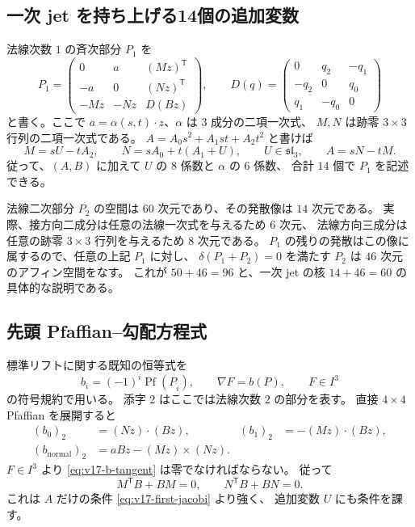 \documentclass[11pt,a4paper]{ltjsarticle}
\theoremstyle{remark}\newtheorem{remark}[theorem]{注意}
\begin{document}
\subsection{一次 jet を持ち上げる14個の追加変数}

法線次数 $1$ の斉次部分 $P_1$ を
\[
 P_1=\begin{pmatrix}
 0&a&(Mz)^{\mathsf T}\\
 -a&0&(Nz)^{\mathsf T}\\
 -Mz&-Nz&D(Bz)
 \end{pmatrix},
\qquad
 D(q)=\begin{pmatrix}0&q_2&-q_1\\-q_2&0&q_0\\q_1&-q_0&0\end{pmatrix}
\]
と書く。ここで $a=\alpha(s,t)\cdot z$、$\alpha$ は $3$ 成分の二項一次式、
$M,N$ は跡零 $3\times3$ 行列の二項一次式である。
$A=A_0s^2+A_1st+A_2t^2$ と書けば
\begin{equation}
 M=sU-tA_2,\qquad N=sA_0+t(A_1+U),\qquad U\in\mathfrak{sl}_3,
 \qquad A=sN-tM.
 \label{eq:v17-lift-mn}
\end{equation}
従って、$(A,B)$ に加えて $U$ の $8$ 係数と $\alpha$ の $6$ 係数、
合計 $14$ 個で $P_1$ を記述できる。

法線二次部分 $P_2$ の空間は $60$ 次元であり、その発散像は $14$ 次元である。
実際、接方向二成分は任意の法線一次式を与えるため $6$ 次元、
法線方向三成分は任意の跡零 $3\times3$ 行列を与えるため $8$ 次元である。
$P_1$ の残りの発散はこの像に属するので、任意の上記 $P_1$ に対し、
$\delta(P_1+P_2)=0$ を満たす $P_2$ は $46$ 次元のアフィン空間をなす。
これが $50+46=96$ と、一次 jet の核 $14+46=60$ の具体的な説明である。

\subsection{先頭 Pfaffian--勾配方程式}

標準リフトに関する既知の恒等式を
\[
 b_i=(-1)^i\operatorname{Pf}(P_{\widehat i}),\qquad
 \nabla F=b(P),\qquad F\in I^3
\]
の符号規約で用いる。
添字 $2$ はここでは法線次数 $2$ の部分を表す。
直接 $4\times4$ Pfaffian を展開すると
\begin{align}
 (b_0)_2&=(Nz)\cdot(Bz),&
 (b_1)_2&=-(Mz)\cdot(Bz),\label{eq:v17-b-tangent}\\
 (b_{\mathrm{normal}})_2&=aBz-(Mz)\times(Nz).
 \label{eq:v17-b-normal}
\end{align}
$F\in I^3$ より \eqref{eq:v17-b-tangent} は零でなければならない。
従って
\begin{equation}
 M^{\mathsf T}B+BM=0,\qquad N^{\mathsf T}B+BN=0.
 \label{eq:v17-mn-orthogonal}
\end{equation}
これは $A$ だけの条件 \eqref{eq:v17-first-jacobi} より強く、
追加変数 $U$ にも条件を課す。
\end{document}
